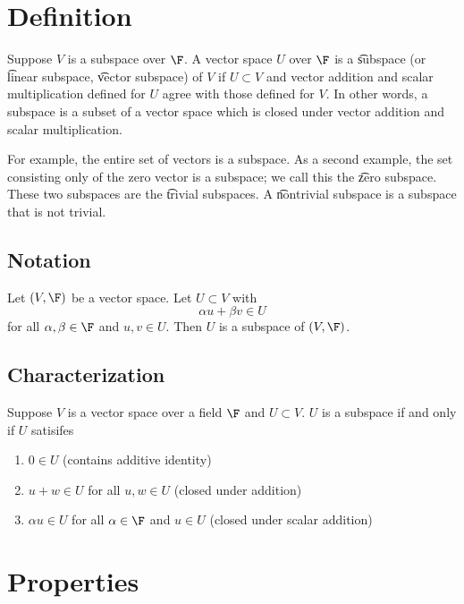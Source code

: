 
\section*{Definition}

Suppose $V$ is a subspace over $\F $.
A vector space $U$ over $\F $ is a \t{subspace} (or \t{linear subspace}, \t{vector subspace}) of $V$ if $U \subset V$ and vector addition and scalar multiplication defined for $U$ agree with those defined for $V$.
In other words, a subspace is a subset of a vector space which is closed under vector addition and scalar multiplication.

For example, the entire set of vectors is a subspace.
As a second example, the set consisting only of the zero vector is a subspace; we call this the \t{zero subspace}.
These two subspaces are the \t{trivial subspaces}.
A \t{nontrivial subspace} is a subspace that is not trivial.

\subsection*{Notation}

Let $(V, \F )$ be a vector space.
Let $U \subset V$ with
\[
\alpha  u + \beta  v \in U
\]
for all $\alpha , \beta  \in \F $ and $u, v \in U$.
Then $U$ is a subspace of $(V, \F )$.

\subsection*{Characterization}


\begin{proposition}
Suppose $V$ is a vector space over a field $\F $ and $U \subset V$.
$U$ is a subspace if and only if $U$ satisifes
  \begin{enumerate}
    \item $0 \in U$ (contains additive identity)
    \item $u + w \in U$ for all $u, w \in U$ (closed under addition)
    \item $\alpha u \in U$ for all $\alpha  \in \F $ and $u \in U$ (closed under scalar addition)
  \end{enumerate}
\end{proposition}

\section*{Properties}


